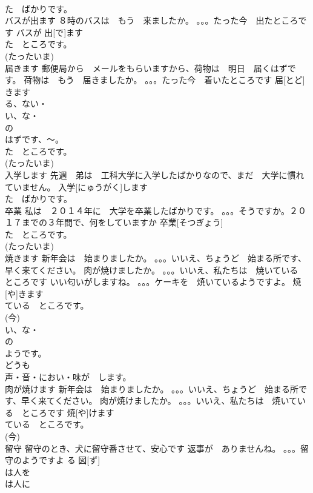 \documentclass[8pt]{extreport}
\begin{document}
\begin{CJK}{UTF8}{min}
\\	た　ばかりです。
\\	バスが出ます	８時のバスは　もう　来ましたか。 。。。たった今　出たところです	バスが 出[で]ます				
\\	た　ところです。　
\\	(たったいま)	
\\	届きます	郵便局から　メールをもらいますから、荷物は　明日　届くはずです。 荷物は　もう　届きましたか。 。。。たった今　着いたところです	届[とど]きます			
\\	る、ない・
\\	い、な・
\\	の
\\	はずです、～。
\\	た　ところです。　
\\	(たったいま)	
\\	入学します	先週　弟は　工科大学に入学したばかりなので、まだ　大学に慣れていません。	入学[にゅうがく]します				
\\	た　ばかりです。
\\	卒業	私は　２０１４年に　大学を卒業したばかりです。 。。。そうですか。２０１７までの３年間で、何をしていますか	卒業[そつぎょう]				
\\	た　ところです。　
\\	(たったいま)	
\\	焼きます	新年会は　始まりましたか。 。。。いいえ、ちょうど　始まる所です、早く来てください。 肉が焼けましたか。 。。。いいえ、私たちは　焼いている　ところです いい匂いがしますね。 。。。ケーキを　焼いているようですよ。	焼[や]きます				
\\	ている　ところです。　
\\	(今) 
\\	い、な・
\\	の
\\	ようです。
\\	どうも
\\	声・音・におい・味が　します。
\\	肉が焼けます	新年会は　始まりましたか。 。。。いいえ、ちょうど　始まる所です、早く来てください。 肉が焼けましたか。 。。。いいえ、私たちは　焼いている　ところです	焼[や]けます				
\\	ている　ところです。　
\\	(今)	
\\	留守	留守のとき、犬に留守番させて、安心です 返事が　ありませんね。 。。。留守のようですよ	る 図[ず]				
\\	は人を
\\	は人に

\end{CJK}
\end{document}
